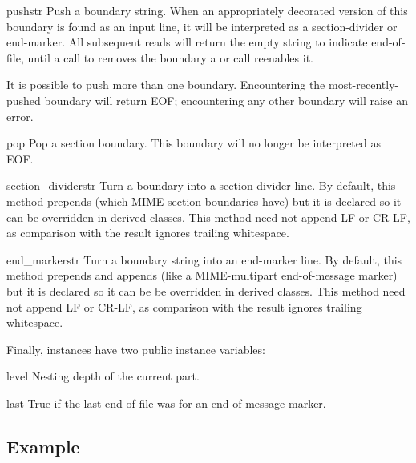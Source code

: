 \begin{methoddesc}{push}{str}
Push a boundary string.  When an appropriately decorated version of
this boundary is found as an input line, it will be interpreted as a
section-divider or end-marker.  All subsequent
reads will return the empty string to indicate end-of-file, until a
call to  removes the boundary a or  call
reenables it.

It is possible to push more than one boundary.  Encountering the
most-recently-pushed boundary will return EOF; encountering any other
boundary will raise an error.
\end{methoddesc}

\begin{methoddesc}{pop}{}
Pop a section boundary.  This boundary will no longer be interpreted
as EOF.
\end{methoddesc}

\begin{methoddesc}{section_divider}{str}
Turn a boundary into a section-divider line.  By default, this
method prepends  (which MIME section boundaries have) but
it is declared so it can be overridden in derived classes.  This
method need not append LF or CR-LF, as comparison with the result
ignores trailing whitespace. 
\end{methoddesc}

\begin{methoddesc}{end_marker}{str}
Turn a boundary string into an end-marker line.  By default, this
method prepends  and appends  (like a
MIME-multipart end-of-message marker) but it is declared so it can be
be overridden in derived classes.  This method need not append LF or
CR-LF, as comparison with the result ignores trailing whitespace.
\end{methoddesc}

Finally,  instances have two public instance variables:

\begin{memberdesc}{level}
Nesting depth of the current part.
\end{memberdesc}

\begin{memberdesc}{last}
True if the last end-of-file was for an end-of-message marker. 
\end{memberdesc}


\subsection{ Example \label{multifile-example}}

